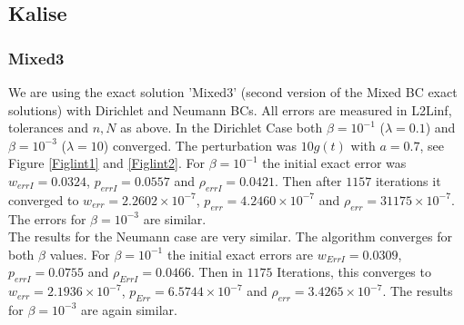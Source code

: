 \documentclass[11pt, a4paper]{article}
\theoremstyle{definition}
\begin{document}
\subsection*{Kalise}
\subsubsection*{Mixed3}
We are using the exact solution 'Mixed3' (second version of the Mixed BC exact solutions) with Dirichlet and Neumann BCs. All errors are measured in L2Linf, tolerances and $n,N$ as above.
In the Dirichlet Case both $\beta = 10^{-1}$ ($\lambda =0.1$) and $\beta = 10^{-3}$ ($\lambda =10$) converged. The perturbation was $10g(t)$ with $a=0.7$, see Figure \ref{Figlint1} and \ref{Figlint2}.
For $\beta=10^{-1}$ the initial exact error was $w_{errI}= 0.0324$, $p_{errI} = 0.0557$ and $\rho_{errI}= 0.0421$. Then after $1157$ iterations it converged to $w_{err}= 2.2602 \times  10^{-7}$, $p_{err} = 4.2460 \times 10^{-7}$ and $\rho_{err} = 31175 \times 10^{-7}$. The errors for $\beta = 10^{-3}$ are similar.\\
The results for the Neumann case are very similar. The algorithm converges for both $\beta$ values. 
For $\beta = 10^{-1}$ the initial exact errors are $w_{ErrI}=0.0309$, $p_{errI} = 0.0755$ and $\rho_{ErrI}= 0.0466$. Then in $1175$ Iterations, this converges to $w_{err}= 2.1936 \times 10^{-7}$, $p_{Err}=6.5744 \times 10^{-7}$ and $\rho_{err} = 3.4265 \times 10^{-7}$. The results for $\beta = 10^{-3}$ are again similar.\\
\end{document}
